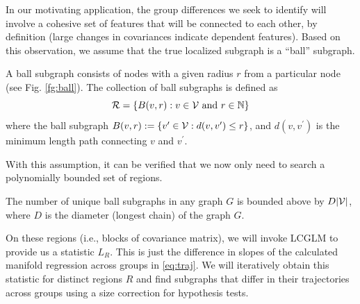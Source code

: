 In our motivating application, the group differences we seek to identify will involve a cohesive set of features that will be 
connected to each other, by definition (large changes in covariances indicate dependent features). 
Based on this observation, we assume that the true localized subgraph is a ``ball'' subgraph. 
\begin{definition} A ball subgraph consists of nodes with a given radius $r$ from a particular node (see Fig. \ref{fg:ball}). The collection of ball subgraphs is defined as
\begin{equation}
\mathcal{R}=\left\{B(v,r):v\in \mathcal{V}\ {\rm and}\ r\in \mathbb{N}\right\}
\end{equation}
where the ball subgraph $B(v,r):=\{v^\prime \in \mathcal{V}:d(v,v^\prime)\le r\}$, and $d(v,v^\prime)$ is the minimum length path connecting $v$ and $v^\prime$.
\end{definition}
%
With this assumption, it can be verified that we now only need to search a polynomially bounded set of regions.
\begin{remark}
The number of unique ball subgraphs in any graph $G$ is bounded above by $D|\mathcal{V}|$, where $D$ is the diameter (longest chain) of the graph $G$.
\end{remark}
 On these regions 
(i.e., blocks of covariance matrix), 
we will invoke LCGLM to provide us a statistic $L_R$. This is just the difference in slopes of the calculated manifold regression across groups in \eqref{eq:traj}. 
We will iteratively obtain this statistic for distinct regions $R$ and find subgraphs that differ in their trajectories across groups using a size correction for hypothesis tests.
